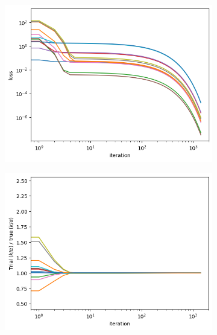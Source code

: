 \documentclass[]{article}
\begin{document}
\begin{appendices}
\begin{figure}[H]
	\caption{Gradient descent performance profile, near a fixed point}
	\begin{subfigure}{.5\textwidth}
		\centering
		\includegraphics[scale=0.40]{loss-vs-iteration-fixed-point.png}
		\label{subfig:convergence-loss-fixed-point}
	\end{subfigure}
	\begin{subfigure}{.5\textwidth}
		\centering
		\includegraphics[scale=0.40]{k-a-ratio-fixed-point.png}
		\label{subfig:convergence-ratio-fixed-point}
	\end{subfigure}
	\label{fig:convergence-fixed-point}
\end{figure}


\end{appendices}
\end{document}
